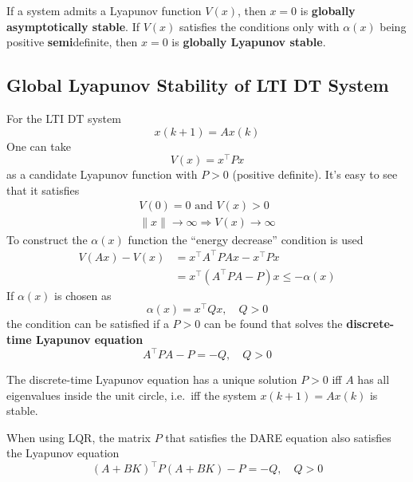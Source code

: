 If a system admits a Lyapunov function $V(x)$, then $x=0$ is \textbf{globally asymptotically stable}.
\newpar{}
If $V(x)$ satisfies the conditions only with $\alpha(x)$ being positive \textbf{semi}definite, then $x=0$ is \textbf{globally Lyapunov stable}.

\subsection{Global Lyapunov Stability of LTI DT System}
For the LTI DT system
\begin{equation*}
    x(k+1)=Ax(k)
\end{equation*}
One can take
\begin{equation*}
    V(x) = x^\top Px
\end{equation*}
as a candidate Lyapunov function with $P>0$ (positive definite). It's easy to see that it satisfies
\begin{gather*}
    V(0) = 0 \text{ and } V(x) > 0 \\
    \lVert x \rVert \to \infty \Rightarrow V(x) \to \infty
\end{gather*}
To construct the $\alpha(x)$ function the ``energy decrease'' condition is used
\begin{align*}
    V(Ax) - V(x) & = x^\top A^\top PAx - x^\top Px                      \\
                 & = x^\top \left(A^\top PA - P\right)x \leq -\alpha(x)
\end{align*}
If $\alpha(x)$ is chosen as
\begin{equation*}
    \alpha(x) = x^\top Qx, \quad Q > 0
\end{equation*}
the condition can be satisfied if a $P>0$ can be found that solves the \textbf{discrete-time Lyapunov equation}
\begin{equation*}
    A^\top PA -P = -Q, \quad Q > 0
\end{equation*}

The discrete-time Lyapunov equation has a unique solution $P > 0$ iff $A$ has all eigenvalues inside the unit circle, i.e.\ iff the system $x(k + 1) = Ax(k)$ is stable.

\newpar{}

When using LQR, the matrix $P$ that satisfies the DARE equation also satisfies the Lyapunov equation
\begin{equation*}
    {(A+BK)}^\top P{(A+BK)} -P = -Q, \quad Q>0
\end{equation*}

